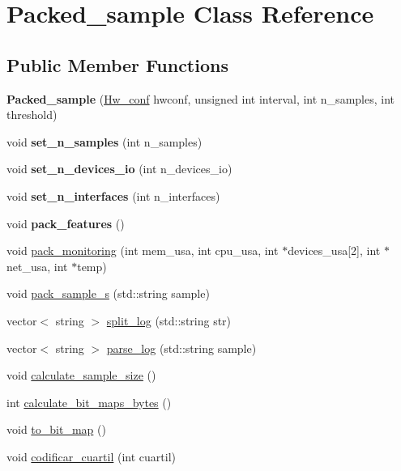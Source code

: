 \hypertarget{classPacked__sample}{}\section{Packed\+\_\+sample Class Reference}
\label{classPacked__sample}
\subsection*{Public Member Functions}
\begin{DoxyCompactItemize}
\item 
\mbox{\label{classPacked__sample_abdd5b40c20de0f358d0edce96b69fd20}} 
{\bfseries Packed\+\_\+sample} (\mbox{\hyperlink{structhw__conf}{Hw\+\_\+conf}} hwconf, unsigned int interval, int n\+\_\+samples, int threshold)
\item 
\mbox{\label{classPacked__sample_a32c76166f873f799f15bbfeb607dd974}} 
void {\bfseries set\+\_\+n\+\_\+samples} (int n\+\_\+samples)
\item 
\mbox{\label{classPacked__sample_a6e50ad3c0460ccd0694f28910e46037b}} 
void {\bfseries set\+\_\+n\+\_\+devices\+\_\+io} (int n\+\_\+devices\+\_\+io)
\item 
\mbox{\label{classPacked__sample_ad738de22eacf4de34a9423585421f24e}} 
void {\bfseries set\+\_\+n\+\_\+interfaces} (int n\+\_\+interfaces)
\item 
\mbox{\label{classPacked__sample_a2dccf6ec9f3175bed7aac496e81de757}} 
void {\bfseries pack\+\_\+features} ()
\item 
void \mbox{\hyperlink{classPacked__sample_acc6f96c07fc1df249ae439b7644deeeb}{pack\+\_\+monitoring}} (int mem\+\_\+usa, int cpu\+\_\+usa, int $\ast$devices\+\_\+usa\mbox{[}2\mbox{]}, int $\ast$net\+\_\+usa, int $\ast$temp)
\item 
void \mbox{\hyperlink{classPacked__sample_a4649ca58fb22958ffbae97337bc33576}{pack\+\_\+sample\+\_\+s}} (std\+::string sample)
\item 
vector$<$ string $>$ \mbox{\hyperlink{classPacked__sample_a89c91c30951a092a804e1f371b226060}{split\+\_\+log}} (std\+::string str)
\item 
vector$<$ string $>$ \mbox{\hyperlink{classPacked__sample_a66e88d8826169e056dc88b9654ce70f8}{parse\+\_\+log}} (std\+::string sample)
\item 
void \mbox{\hyperlink{classPacked__sample_a3f941028cbd26a98a99cd3c000b08666}{calculate\+\_\+sample\+\_\+size}} ()
\item 
int \mbox{\hyperlink{classPacked__sample_a09d7b87f1737fa09df7b3e19bf0d728b}{calculate\+\_\+bit\+\_\+maps\+\_\+bytes}} ()
\item 
void \mbox{\hyperlink{classPacked__sample_ab2f6161820109568b4eb1da0b32c2b11}{to\+\_\+bit\+\_\+map}} ()
\item 
void \mbox{\hyperlink{classPacked__sample_aee75395c481cd25d8a46b5bc2f9b1b8d}{codificar\+\_\+cuartil}} (int cuartil)
\end{DoxyCompactItemize}
